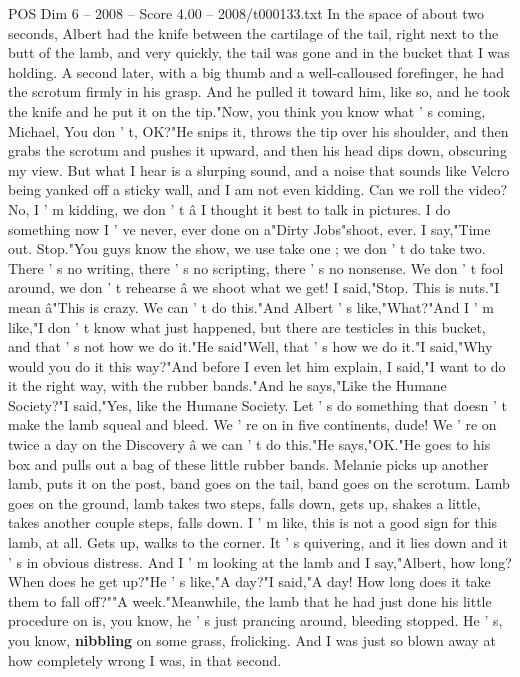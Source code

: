 \begin{textsample}{POS Dim 6 – 2008 – Score 4.00 – 2008/t000133.txt}
In the space of about two seconds, Albert had the knife between the cartilage of the tail, right next to the butt of the lamb, and very quickly, the tail was gone and in the bucket that I was holding.
A second later, with a big thumb and a well-calloused forefinger, he had the scrotum firmly in his grasp.
And he pulled it toward him, like so, and he took the knife and he put it on the tip."Now, you think you know what ' s coming, Michael, You don ' t, OK?"He snips it, throws the tip over his shoulder, and then grabs the scrotum and pushes it upward, and then his head dips down, obscuring my view.
But what I hear is a slurping sound, and a noise that sounds like Velcro being yanked off a sticky wall, and I am not even kidding.
Can we roll the video?
No, I ' m kidding, we don ' t â I thought it best to talk in pictures.
I do something now I ' ve never, ever done on a"Dirty Jobs"shoot, ever.
I say,"Time out.
Stop."You guys know the show, we use take one ; we don ' t do take two.
There ' s no writing, there ' s no scripting, there ' s no nonsense.
We don ' t fool around, we don ' t rehearse â we shoot what we get!
I said,"Stop.
This is nuts."I mean â"This is crazy.
We can ' t do this."And Albert ' s like,"What?"And I ' m like,"I don ' t know what just happened, but there are testicles in this bucket, and that ' s not how we do it."He said"Well, that ' s how we do it."I said,"Why would you do it this way?"And before I even let him explain, I said,"I want to do it the right way, with the rubber bands."And he says,"Like the Humane Society?"I said,"Yes, like the Humane Society.
Let ' s do something that doesn ' t make the lamb squeal and bleed.
We ' re on in five continents, dude!
We ' re on twice a day on the Discovery â we can ' t do this."He says,"OK."He goes to his box and pulls out a bag of these little rubber bands.
Melanie picks up another lamb, puts it on the post, band goes on the tail, band goes on the scrotum.
Lamb goes on the ground, lamb takes two steps, falls down, gets up, shakes a little, takes another couple steps, falls down.
I ' m like, this is not a good sign for this lamb, at all.
Gets up, walks to the corner.
It ' s quivering, and it lies down and it ' s in obvious distress.
And I ' m looking at the lamb and I say,"Albert, how long?
When does he get up?"He ' s like,"A day?"I said,"A day!
How long does it take them to fall off?""A week."Meanwhile, the lamb that he had just done his little procedure on is, you know, he ' s just prancing around, bleeding stopped.
He ' s, you know, \textbf{nibbling} on some grass, frolicking.
And I was just so blown away at how completely wrong I was, in that second.

\end{textsample}
